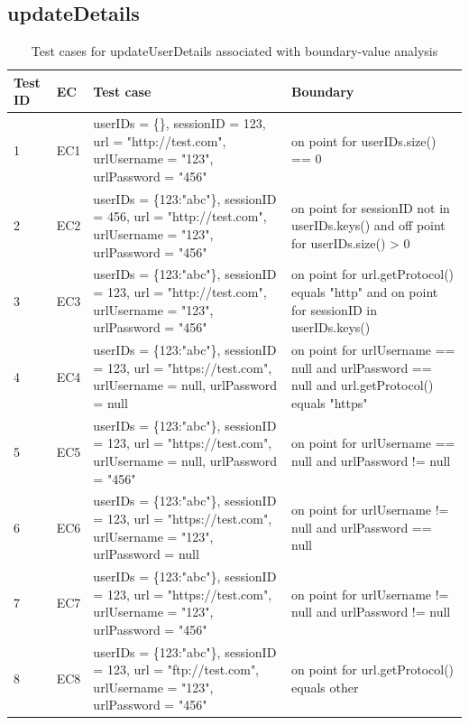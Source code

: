 \documentclass{article}
\begin{document}
\subsection{updateDetails}
\begin{longtable}{|p{0.5cm}|p{0.5cm}|p{7cm}|p{5cm}|}
\caption{Test cases for updateUserDetails associated with boundary-value analysis}\\
\hline 
Test ID&EC&Test case&Boundary\\
\hline  
1&EC1&userIDs = \{\}, sessionID = 123, url = "http://test.com", urlUsername = "123", urlPassword = "456"&on point for userIDs.size() == 0\\
\hline
2&EC2&userIDs = \{123:"abc"\}, sessionID = 456, url = "http://test.com", urlUsername = "123", urlPassword = "456"&on point for sessionID not in userIDs.keys() and off point for userIDs.size() > 0\\
\hline
3&EC3&userIDs = \{123:"abc"\}, sessionID = 123, url = "http://test.com", urlUsername = "123", urlPassword = "456"&on point for url.getProtocol() equals "http" and on point for sessionID in userIDs.keys()\\
\hline
4&EC4&userIDs = \{123:"abc"\}, sessionID = 123, url = "https://test.com", urlUsername = null, urlPassword = null&on point for urlUsername == null and urlPassword == null and url.getProtocol() equals "https"\\
\hline
5&EC5&userIDs = \{123:"abc"\}, sessionID = 123, url = "https://test.com", urlUsername = null, urlPassword = "456"&on point for urlUsername == null and urlPassword != null\\
\hline
6&EC6&userIDs = \{123:"abc"\}, sessionID = 123, url = "https://test.com", urlUsername = "123", urlPassword = null&on point for urlUsername != null and urlPassword == null\\
\hline
7&EC7&userIDs = \{123:"abc"\}, sessionID = 123, url = "https://test.com", urlUsername = "123", urlPassword = "456"&on point for urlUsername != null and urlPassword != null\\
\hline
8&EC8&userIDs = \{123:"abc"\}, sessionID = 123, url = "ftp://test.com", urlUsername = "123", urlPassword = "456"&on point for url.getProtocol() equals other\\
\hline
\end{longtable}

\end{document}
